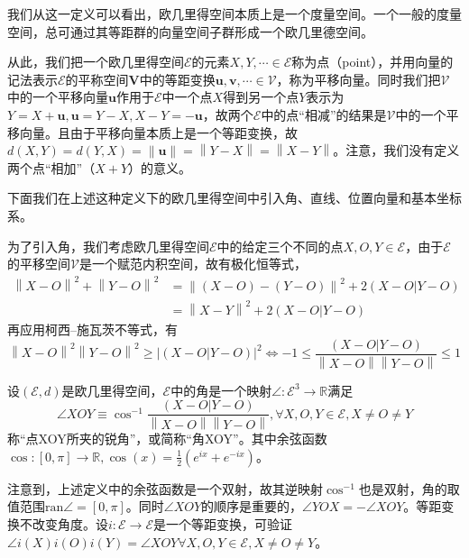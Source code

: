 \documentclass[main.tex]{subfiles}
\begin{document}
我们从这一定义可以看出，欧几里得空间本质上是一个度量空间。一个一般的度量空间，总可通过其等距群的向量空间子群形成一个欧几里德空间。

从此，我们把一个欧几里得空间$\mathcal{E}$的元素$X,Y,\cdots\in\mathcal{E}$称为点（point），并用向量的记法表示$\mathcal{E}$的平称空间$\mathbf{V}$中的等距变换$\mathbf{u},\mathbf{v},\cdots\in\mathcal{V}$，称为平移向量。同时我们把$\mathcal{V}$中的一个平移向量$\mathbf{u}$作用于$\mathcal{E}$中一个点$X$得到另一个点$Y$表示为$Y=X+\mathbf{u},\mathbf{u}=Y-X,X-Y=-\mathbf{u}$，故两个$\mathcal{E}$中的点“相减”的结果是$\mathcal{V}$中的一个平移向量。且由于平移向量本质上是一个等距变换，故$d\left(X,Y\right)=d\left(Y,X\right)=\left\|\mathbf{u}\right\|=\left\|Y-X\right\|=\left\|X-Y\right\|$。注意，我们没有定义两个点“相加”（$X+Y$）的意义。

下面我们在上述这种定义下的欧几里得空间中引入角、直线、位置向量和基本坐标系。

为了引入角，我们考虑欧几里得空间$\mathcal{E}$中的给定三个不同的点$X,O,Y\in\mathcal{E}$，由于$\mathcal{E}$的平移空间$\mathcal{V}$是一个赋范内积空间，故有极化恒等式，
\begin{align*}
\left\|X-O\right\|^2+\left\|Y-O\right\|^2&=\left\|\left(X-O\right)-\left(Y-O\right)\right\|^2+2\left(X-O|Y-O\right)\\
&=\left\|X-Y\right\|^2+2\left(X-O|Y-O\right)
\end{align*}
再应用柯西--施瓦茨不等式，有
\[\left\|X-O\right\|^2\left\|Y-O\right\|^2\geq\left|\left(X-O|Y-O\right)\right|^2\Leftrightarrow-1\leq\frac{\left(X-O|Y-O\right)}{\left\|X-O\right\|\left\|Y-O\right\|}\leq1\]

\begin{definition}[角]
设$\left(\mathcal{E},d\right)$是欧几里得空间，$\mathcal{E}$中的角是一个映射$\angle:\mathcal{E}^3\rightarrow\mathbb{R}$满足
\[\angle XOY\equiv\cos^{-1}\frac{\left(X-O|Y-O\right)}{\left\|X-O\right\|\left\|Y-O\right\|},\forall X,O,Y\in\mathcal{E},X\neq O\neq Y\]
称“点XOY所夹的锐角”，或简称“角XOY”。其中余弦函数$\cos:\left[0,\pi\right]\rightarrow\mathbb{R},\cos\left(x\right)=\frac{1}{2}\left(e^{ix}+e^{-ix}\right)$。
\end{definition}

注意到，上述定义中的余弦函数是一个双射，故其逆映射$\cos^{-1}$也是双射，角的取值范围$\mathrm{ran}\angle=\left[0,\pi\right]$。同时$\angle XOY$的顺序是重要的，$\angle YOX=-\angle XOY$。等距变换不改变角度。设$i:\mathcal{E}\rightarrow\mathcal{E}$是一个等距变换，可验证$\angle i\left(X\right)i\left(O\right)i\left(Y\right)=\angle XOY\forall X,O,Y\in\mathcal{E},X\neq O\neq Y$。
\end{document}

